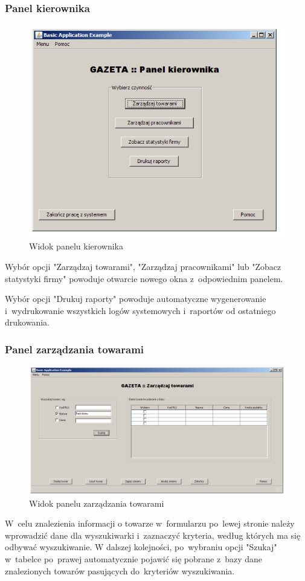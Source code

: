 \subsubsection{Panel kierownika}
\begin{figure}[h]
\includegraphics[width=1\textwidth]{gfx/szef_szefow.png}
\caption{Widok panelu kierownika}
\end{figure}
Wybór opcji "Zarządzaj towarami", "Zarządzaj pracownikami" lub "Zobacz statystyki firmy" powoduje otwarcie nowego okna z~odpowiednim panelem.

Wybór opcji "Drukuj raporty" powoduje automatyczne wygenerowanie i~wydrukowanie wszystkich logów systemowych i~raportów od ostatniego drukowania.
\clearpage
\subsubsection{Panel zarządzania towarami}
\begin{figure}[h]
\begin{center}
\includegraphics[width=20cm,angle=90,keepaspectratio]{gfx/zarzadzaj_towarami.png}
\end{center}
\caption{Widok panelu zarządzania towarami}
\end{figure}
W~celu znalezienia informacji o towarze w~formularzu po~lewej stronie należy wprowadzić dane dla wyszukiwarki i~zaznaczyć kryteria, według których ma się odbywać wyszukiwanie. W dalszej kolejności, po~wybraniu opcji "Szukaj" w~tabelce po~prawej automatycznie pojawić się pobrane z~bazy dane znalezionych towarów pasujących do~kryteriów wyszukiwania.


